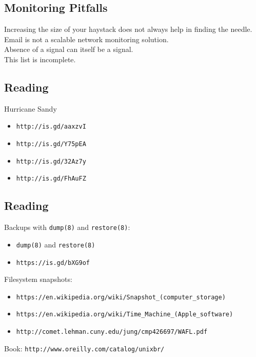 \documentclass[xga]{xdvislides}
\begin{document}
\subsection{Monitoring Pitfalls}
\vspace*{\fill}
\Huge
\begin{center}
Increasing the size of your haystack does not always
help in finding the needle. \\
\vspace{.4in}
Email is not a scalable network monitoring solution. \\
\vspace{.4in}
Absence of a signal can itself be a signal. \\
\vspace{.4in}
This list is incomplete.
\end{center}
\Normalsize
\vspace*{\fill}

\subsection{Reading}
Hurricane Sandy
\begin{itemize}
	\item \verb+http://is.gd/aaxzvI+
	\item \verb+http://is.gd/Y75pEA+
	\item \verb+http://is.gd/32Az7y+
	\item \verb+http://is.gd/FhAuFZ+
\end{itemize}

\subsection{Reading}
Backups with {\tt dump(8)} and {\tt restore(8)}:
\begin{itemize}
	\item \verb+dump(8)+ and \verb+restore(8)+
	\item \verb+https://is.gd/bXG9of+
\end{itemize}
\vspace{.5in}

Filesystem snapshots:
\begin{itemize}
	\item \verb+https://en.wikipedia.org/wiki/Snapshot_(computer_storage)+
	\item \verb+https://en.wikipedia.org/wiki/Time_Machine_(Apple_software)+
	\item \verb+http://comet.lehman.cuny.edu/jung/cmp426697/WAFL.pdf+
\end{itemize}
\vspace{.5in}
Book: \verb+http://www.oreilly.com/catalog/unixbr/+
\end{document}
